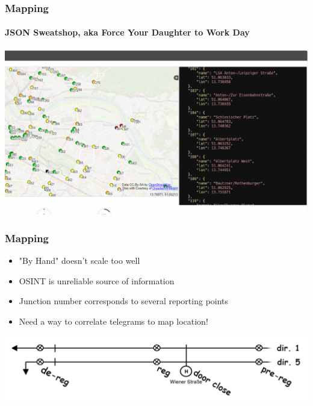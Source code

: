 \begin{frame}
  \frametitle{Mapping}
  \framesubtitle{JSON Sweatshop, aka Force Your Daughter to Work Day}
  \centering
  \includegraphics[width=.8\textwidth]{./figs/urbic-osint-json.png}
\end{frame}

\begin{frame}
  \frametitle{Mapping}
    \begin{itemize}
      \item "By Hand" doesn't scale too well
      \item OSINT is unreliable source of information
      \item Junction number corresponds to several reporting points
      \item Need a way to correlate telegrams to map location!
    \end{itemize}
    \vspace{20pt}
    \includegraphics[width=\columnwidth]{./figs/moar_points.png}
\end{frame}

